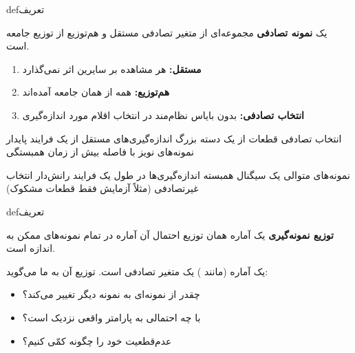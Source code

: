 
\begin{PSbox}[unbreakable]{def}{تعریف}

یک \textbf{نمونه تصادفی}  مجموعه‌ای از  متغیر تصادفی مستقل و هم‌توزیع  از توزیع جامعه است.

\end{PSbox}


\begin{enumerate}
\def\labelenumi{\arabic{enumi}.}
\tightlist
\item
  \textbf{مستقل:} هر مشاهده بر سایرین اثر نمی‌گذارد
\item
  \textbf{هم‌توزیع:} همه از همان جامعه آمده‌اند
\item
  \textbf{انتخاب تصادفی:} بدون بایاس نظام‌مند در انتخاب اقلام مورد اندازه‌گیری
\end{enumerate}


\lr{\PSyes{}} انتخاب تصادفی قطعات از یک دسته بزرگ\PSbr{}\lr{\PSyes{}} اندازه‌گیری‌های مستقل از یک فرایند پایدار\PSbr{}\lr{\PSyes{}} نمونه‌های نویز با فاصله بیش از زمان همبستگی


\PSno{} نمونه‌های متوالی یک سیگنال همبسته\PSbr{}\PSno{} اندازه‌گیری‌ها در طول یک فرایند رانش‌دار\PSbr{}\PSno{} انتخاب غیرتصادفی (مثلاً آزمایش فقط قطعات مشکوک)


\begin{PSbox}[unbreakable]{def}{تعریف}

\textbf{توزیع نمونه‌گیری} یک آماره همان توزیع احتمال آن آماره در تمام نمونه‌های ممکن به اندازه  است.

\end{PSbox}


یک آماره (مانند ) یک متغیر تصادفی است. توزیع آن به ما می‌گوید:

\begin{itemize}
\tightlist
\item
  چقدر از نمونه‌ای به نمونه دیگر تغییر می‌کند؟
\item
  با چه احتمالی به پارامتر واقعی نزدیک است؟
\item
  عدم‌قطعیت خود را چگونه کمّی کنیم؟
\end{itemize}

